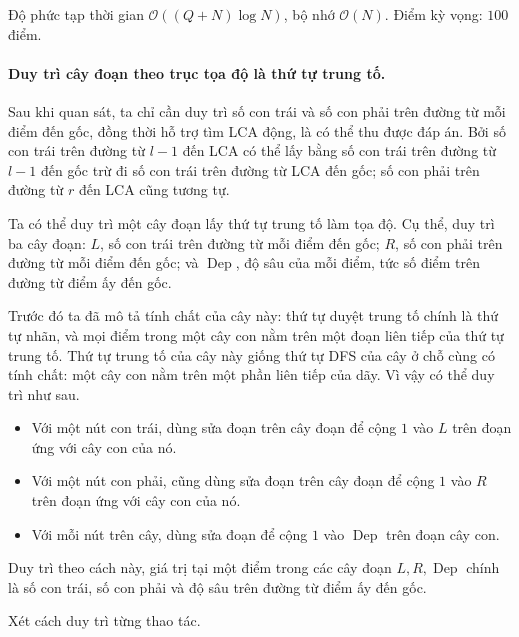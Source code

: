\documentclass[11pt]{article}
\newcommand{\Oh}{\mathcal{O}}
\begin{document}
Độ phức tạp thời gian \(\Oh((Q+N)\log N)\), bộ nhớ \(\Oh(N)\). Điểm kỳ vọng:
\(100\) điểm.

\paragraph{Duy trì cây đoạn theo trục tọa độ là thứ tự trung tố.}
Sau khi quan sát, ta chỉ cần duy trì số con trái và số con phải trên đường từ
mỗi điểm đến gốc, đồng thời hỗ trợ tìm LCA động, là có thể thu được đáp án.
Bởi số con trái trên đường từ \(l-1\) đến LCA có thể lấy bằng số con trái trên
đường từ \(l-1\) đến gốc trừ đi số con trái trên đường từ LCA đến gốc; số con
phải trên đường từ \(r\) đến LCA cũng tương tự.

Ta có thể duy trì một cây đoạn lấy thứ tự trung tố làm tọa độ. Cụ thể, duy trì
ba cây đoạn: \(L\), số con trái trên đường từ mỗi điểm đến gốc; \(R\), số con
phải trên đường từ mỗi điểm đến gốc; và \(\operatorname{Dep}\), độ sâu của mỗi
điểm, tức số điểm trên đường từ điểm ấy đến gốc.

Trước đó ta đã mô tả tính chất của cây này: thứ tự duyệt trung tố chính là thứ
tự nhãn, và mọi điểm trong một cây con nằm trên một đoạn liên tiếp của thứ tự
trung tố. Thứ tự trung tố của cây này giống thứ tự DFS của cây ở chỗ cùng có
tính chất: một cây con nằm trên một phần liên tiếp của dãy. Vì vậy có thể duy
trì như sau.

\begin{itemize}
  \item Với một nút con trái, dùng sửa đoạn trên cây đoạn để cộng \(1\) vào
  \(L\) trên đoạn ứng với cây con của nó.

  \item Với một nút con phải, cũng dùng sửa đoạn trên cây đoạn để cộng \(1\)
  vào \(R\) trên đoạn ứng với cây con của nó.

  \item Với mỗi nút trên cây, dùng sửa đoạn để cộng \(1\) vào
  \(\operatorname{Dep}\) trên đoạn cây con.
\end{itemize}

Duy trì theo cách này, giá trị tại một điểm trong các cây đoạn \(L,R,\operatorname{Dep}\)
chính là số con trái, số con phải và độ sâu trên đường từ điểm ấy đến gốc.

Xét cách duy trì từng thao tác.
\end{document}
